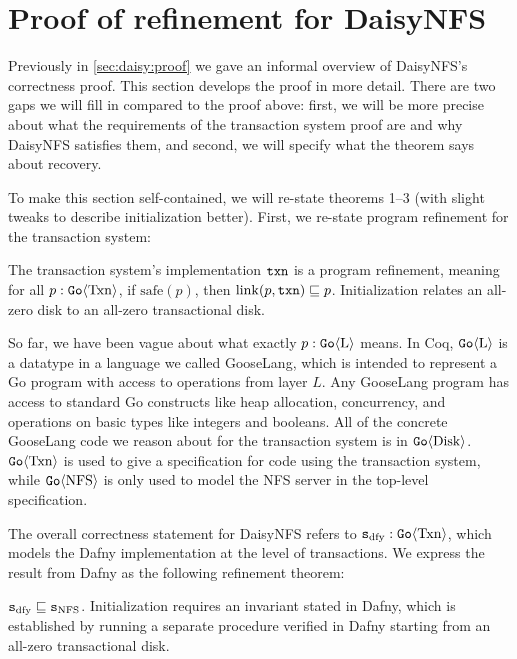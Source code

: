 \section{Proof of refinement for DaisyNFS}
\label{appendix:proof}

\setcounter{theorem}{0}

Previously in \cref{sec:daisy:proof} we gave an informal overview of DaisyNFS's
correctness proof. This section develops the proof in more detail. There are two
gaps we will fill in compared to the proof above: first, we will be more precise
about what the requirements of the transaction system proof are and why DaisyNFS
satisfies them, and second, we will specify what the theorem says about recovery.

To make this section self-contained, we will re-state theorems 1--3 (with slight
tweaks to describe initialization better). First, we re-state program refinement
for the transaction system:

\begin{theorem}
  The transaction system's implementation $\texttt{txn}$ is a program refinement,
  meaning for all $p : \mathtt{Go}\langle \mathrm{Txn} \rangle$, if $\mathrm{safe}(p)$, then
  $\mathrm{link}(p, \texttt{txn}) \sqsubseteq p$. Initialization relates an all-zero
  disk to an all-zero transactional disk.
  \label{thm:txn-appendix}
\end{theorem}

So far, we have been vague about what exactly $p : \mathtt{Go}\langle \mathrm{L} \rangle$ means. In
Coq, $\mathtt{Go}\langle \mathrm{L} \rangle$ is a datatype in a language we called GooseLang, which is
intended to represent a Go program with access to operations from layer $L$. Any
GooseLang program has access to standard Go constructs like heap allocation,
concurrency, and operations on basic types like integers and booleans. All of
the concrete GooseLang code we reason about for the transaction system is in
$\mathtt{Go}\langle \mathrm{Disk} \rangle$. $\mathtt{Go}\langle \mathrm{Txn} \rangle$ is used to give a specification for code
using the transaction system, while $\mathtt{Go}\langle \mathrm{NFS} \rangle$ is only used to model the
NFS server in the top-level specification.

The overall correctness statement for DaisyNFS refers to
$\texttt{s}_{\mathrm{dfy}} : \mathtt{Go}\langle \mathrm{Txn} \rangle$, which models the Dafny implementation at the level
of transactions. We express the result from Dafny as the following refinement
theorem:

\begin{theorem}
  $\texttt{s}_{\mathrm{dfy}} \sqsubseteq \texttt{s}_{\mathrm{NFS}}$. Initialization requires an invariant stated in Dafny,
  which is established by running a separate  procedure verified in
  Dafny starting from an all-zero transactional disk.
  \label{thm:dafny-appendix}
\end{theorem}

